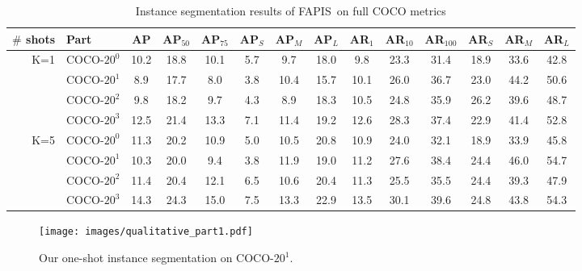 \documentclass[final]{cvpr}
\def\Approach{FAPIS}
\begin{document}
% 
\vspace{-10pt}
\begin{table*}[h]
\begin{center}
\small
\setlength{\tabcolsep}{5pt}
\begin{tabular}{ r  |l|ccc|ccc|ccc|ccc}
\hline
\hline
\textbf{$\#$ shots} & \textbf{Part} & \textbf{AP} & \textbf{AP$_{50}$} & \textbf{AP$_{75}$} & \textbf{AP$_S$} & \textbf{AP$_M$} & \textbf{AP$_L$} & \textbf{AR$_{1}$} & \textbf{AR$_{10}$} & \textbf{AR$_{100}$} & \textbf{AR$_{S}$} & \textbf{AR$_{M}$} & \textbf{AR$_{L}$} \\
 \hline
\multirow{4}{*}{K=1}  
&  COCO-$20^0$     & 10.2 & 18.8 & 10.1 & 5.7 & 9.7 & 18.0 & 9.8 & 23.3 & 31.4 & 18.9 & 33.6 & 42.8 \\
&  COCO-$20^1$     & 8.9 & 17.7 & 8.0 & 3.8 & 10.4 & 15.7 & 10.1 & 26.0 & 36.7 & 23.0 & 44.2 & 50.6 \\
&  COCO-$20^2$     & 9.8 & 18.2 & 9.7 & 4.3 & 8.9 & 18.3 & 10.5 & 24.8 & 35.9 & 26.2 & 39.6 & 48.7 \\
&  COCO-$20^3$     & 12.5 & 21.4 & 13.3 & 7.1 & 11.4 & 19.2 & 12.6 & 28.3 & 37.4 & 22.9 & 41.4 & 52.8\\
\hline
\multirow{4}{*}{K=5}  
&  COCO-$20^0$     & 11.3 & 20.2 & 10.9 & 5.0 & 10.5 & 20.8 & 10.9 & 24.0 & 32.1 & 18.9 & 33.9 & 45.8 \\
&  COCO-$20^1$     & 10.3 & 20.0 &  9.4 & 3.8 & 11.9 & 19.0 & 11.2 & 27.6 & 38.4 & 24.4 & 46.0 & 54.7 \\
&  COCO-$20^2$     & 11.4 & 20.4 & 12.1 & 6.5 & 10.6 & 20.4 & 11.3 & 25.5 & 35.5 & 24.4 & 39.3 & 47.9 \\
&  COCO-$20^3$     & 14.3 & 24.3 & 15.0 & 7.5 & 13.3 & 22.9 & 13.5 & 30.1 & 39.6 & 24.8 & 43.8 & 54.3\\
\hline
\hline
\end{tabular}
\end{center}
\vspace{-5pt}
\caption{Instance segmentation results of \Approach~on full COCO metrics}
\label{tab:coco_segm}
\end{table*}

%

\begin{figure*}[h!]
    \centering
    \texttt{[image: images/qualitative\_part1.pdf]}
    \caption{Our one-shot instance segmentation on COCO-$20^1$.}
    \label{fig:qualitative_part1}
\end{figure*}
\end{document}

